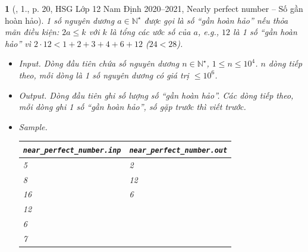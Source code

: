 \documentclass{article}
\newtheorem{baitoan}{}
\begin{document}
\begin{baitoan}[\cite{Trung_HSG_THPT_Tin}, 1., p. 20, HSG Lớp 12 Nam Định 2020--2021, Nearly perfect number -- Số gần hoàn hảo]
	1 số nguyên dương $a\in\mathbb{N}^\star$ được gọi là {\rm số ``gần hoàn hảo''} nếu thỏa mãn điều kiện: $2a\le k$ với $k$ là tổng các ước số của $a$, e.g., $12$ là 1 số ``gần hoàn hảo'' vì $2\cdot12 < 1 + 2 + 3 + 4 + 6 + 12$ ($24 < 28$).
	\begin{itemize}
		\item {\sf Input.} Dòng đầu tiên chứa số nguyên dương $n\in\mathbb{N}^\star$, $1\le n\le10^4$. $n$ dòng tiếp theo, mỗi dòng là 1 số nguyên dương có giá trị $\le10^6$.
		\item {\sf Output.} Dòng đầu tiên ghi số lượng số ``gần hoàn hảo''. Các dòng tiếp theo, mỗi dòng ghi 1 số ``gần hoàn hảo'', số gặp trước thì viết trước.
		\item {\sf Sample.}
		\begin{table}[H]
			\centering
			\begin{tabular}{|l|l|}
				\hline
				\verb|near_perfect_number.inp| & \verb|near_perfect_number.out| \\
				\hline
				5 & 2 \\
				8 & 12 \\
				16 & 6 \\
				12 & \\
				6 & \\
				7 & \\
				\hline
			\end{tabular}
		\end{table}
	\end{itemize}
\end{baitoan}
\end{document}
